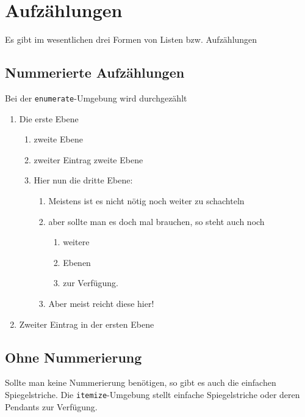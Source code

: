 \section{Aufzählungen}

Es gibt im wesentlichen drei Formen von Listen bzw. Aufzählungen

\subsection{Nummerierte Aufzählungen}
Bei der \texttt{enumerate}-Umgebung wird durchgezählt
 \begin{enumerate}
  \item Die erste Ebene 
   \begin{enumerate}
    \item zweite Ebene
    \item zweiter Eintrag zweite Ebene
    \item Hier nun die dritte Ebene:
      \begin{enumerate}
        \item Meistens ist es nicht nötig noch weiter zu schachteln
        \item aber sollte man es doch mal brauchen, so steht auch noch 
         \begin{enumerate}
           \item weitere 
           \item Ebenen 
           \item zur Verfügung.
         \end{enumerate}
        \item Aber meist reicht diese hier!  
      \end{enumerate}
    \end{enumerate}
  \item Zweiter Eintrag in der ersten Ebene
 \end{enumerate}

\subsection{Ohne Nummerierung}
 
Sollte man keine Nummerierung benötigen, so gibt es auch die einfachen Spiegelstriche. 
Die \texttt{itemize}-Umgebung stellt einfache Spiegelstriche oder deren Pendants zur Verfügung. 

